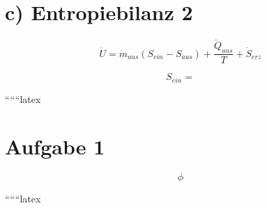 \section*{c) Entropiebilanz 2}

\[
\dot{U} = \dot{m}_{aus} \left( S_{ein} - S_{aus} \right) + \frac{\dot{Q}_{aus}}{T} + \dot{S}_{erz}
\]

\[
S_{ein} =
\]

``````latex


\section*{Aufgabe 1}

\begin{equation}
\phi
\end{equation}

``````latex